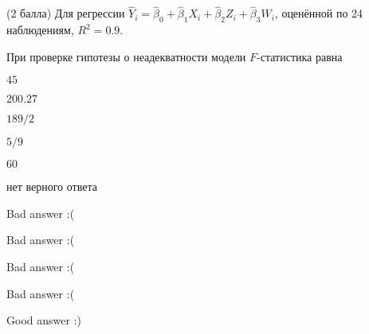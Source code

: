 
\begin{question}
(2 балла) Для регрессии
\(\hat Y_i = \hat\beta_0 + \hat\beta_1 X_i + \hat\beta_2 Z_i + \hat\beta_3 W_i\),
оценённой по 24 наблюдениям, \(R^2=0.9\).

При проверке гипотезы о неадекватности модели \(F\)-статистика равна
\begin{answerlist}
  \item \(45\)
  \item \(200.27\)
  \item \(189/2\)
  \item \(5/9\)
  \item \(60\)
  \item нет верного ответа
\end{answerlist}
\end{question}

\begin{solution}
\begin{answerlist}
  \item Bad answer :(
  \item Bad answer :(
  \item Bad answer :(
  \item Bad answer :(
  \item Good answer :)
\end{answerlist}
\end{solution}
